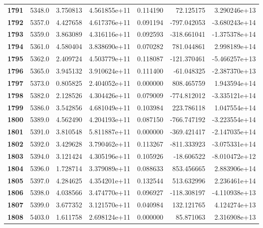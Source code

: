 \documentclass{report}[12pt]
\begin{document}
\begin{center}
\begin{tabular}{lrrrrrr}
\textbf{1791} &         5348.0 &   3.750813 &  4.561855e+11 &    0.114190 &    72.125175 &  3.290246e+13 \\
\textbf{1792} &         5357.0 &   4.427658 &  4.617376e+11 &    0.091194 &  -797.042053 & -3.680243e+14 \\
\textbf{1793} &         5359.0 &   3.863089 &  4.316116e+11 &    0.092593 &  -318.661041 & -1.375378e+14 \\
\textbf{1794} &         5361.0 &   4.580404 &  3.838690e+11 &    0.070282 &   781.044861 &  2.998189e+14 \\
\textbf{1795} &         5362.0 &   2.409724 &  4.503779e+11 &    0.118087 &  -121.370461 & -5.466257e+13 \\
\textbf{1796} &         5365.0 &   3.945132 &  3.910624e+11 &    0.111400 &   -61.048325 & -2.387370e+13 \\
\textbf{1797} &         5373.0 &   0.805825 &  2.404052e+11 &    0.000000 &   808.465759 &  1.943594e+14 \\
\textbf{1798} &         5382.0 &   2.128526 &  4.304426e+11 &    0.079009 &  -774.812012 & -3.335121e+14 \\
\textbf{1799} &         5386.0 &   3.542856 &  4.681049e+11 &    0.103984 &   223.786118 &  1.047554e+14 \\
\textbf{1800} &         5389.0 &   4.562490 &  4.204193e+11 &    0.087150 &  -766.747192 & -3.223554e+14 \\
\textbf{1801} &         5391.0 &   3.810548 &  5.811887e+11 &    0.000000 &  -369.421417 & -2.147035e+14 \\
\textbf{1802} &         5392.0 &   3.429628 &  3.790462e+11 &    0.113267 &  -811.333923 & -3.075331e+14 \\
\textbf{1803} &         5394.0 &   3.121424 &  4.305196e+11 &    0.105926 &   -18.606522 & -8.010472e+12 \\
\textbf{1804} &         5396.0 &   1.728714 &  3.379089e+11 &    0.088633 &   853.456665 &  2.883906e+14 \\
\textbf{1805} &         5397.0 &   4.284625 &  4.354201e+11 &    0.132544 &   513.632996 &  2.236461e+14 \\
\textbf{1806} &         5398.0 &   4.038566 &  3.474770e+11 &    0.096927 &  -118.308197 & -4.110938e+13 \\
\textbf{1807} &         5399.0 &   3.677352 &  3.121570e+11 &    0.040984 &   132.121765 &  4.124274e+13 \\
\textbf{1808} &         5403.0 &   1.611758 &  2.698124e+11 &    0.000000 &    85.871063 &  2.316908e+13 \\

\end{tabular}
\end{center}
\end{document}
